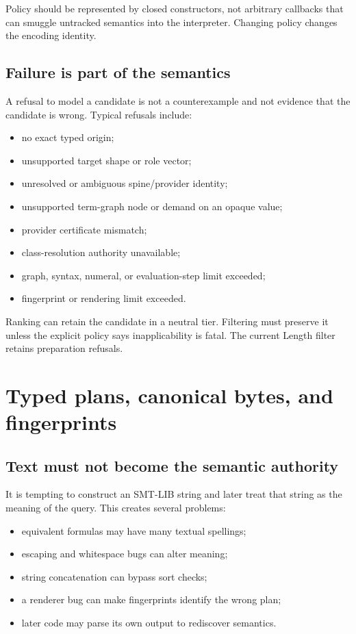 \documentclass[10pt,letterpaper,oneside]{report}
\begin{document}
Policy should be represented by closed constructors, not arbitrary callbacks that can smuggle untracked semantics into the interpreter. Changing policy changes the encoding identity.

\section{Failure is part of the semantics}

A refusal to model a candidate is not a counterexample and not evidence that the candidate is wrong. Typical refusals include:

\begin{itemize}
\item no exact typed origin;
\item unsupported target shape or role vector;
\item unresolved or ambiguous spine/provider identity;
\item unsupported term-graph node or demand on an opaque value;
\item provider certificate mismatch;
\item class-resolution authority unavailable;
\item graph, syntax, numeral, or evaluation-step limit exceeded;
\item fingerprint or rendering limit exceeded.
\end{itemize}

Ranking can retain the candidate in a neutral tier. Filtering must preserve it unless the explicit policy says inapplicability is fatal. The current Length filter retains preparation refusals.

\chapter{Typed plans, canonical bytes, and fingerprints}
\label{chap:canonical}

\section{Text must not become the semantic authority}

It is tempting to construct an SMT-LIB string and later treat that string as the meaning of the query. This creates several problems:

\begin{itemize}
\item equivalent formulas may have many textual spellings;
\item escaping and whitespace bugs can alter meaning;
\item string concatenation can bypass sort checks;
\item a renderer bug can make fingerprints identify the wrong plan;
\item later code may parse its own output to rediscover semantics.
\end{itemize}
\end{document}
